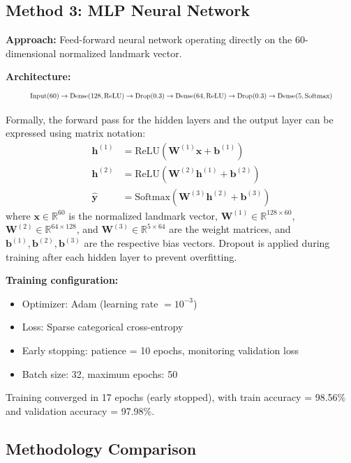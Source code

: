 \documentclass[11pt,a4paper]{article}
\begin{document}
\subsection{Method 3: MLP Neural Network}

\textbf{Approach:} Feed-forward neural network operating directly on the 60-dimensional normalized landmark vector.

\textbf{Architecture:}
\begin{equation}
\resizebox{0.9\textwidth}{!}{$\text{Input}(60) \rightarrow \text{Dense}(128, \text{ReLU}) \rightarrow \text{Drop}(0.3) \rightarrow \text{Dense}(64, \text{ReLU}) \rightarrow \text{Drop}(0.3) \rightarrow \text{Dense}(5, \text{Softmax})$}
\end{equation}

Formally, the forward pass for the hidden layers and the output layer can be expressed using matrix notation:
\begin{align}
\mathbf{h}^{(1)} &= \text{ReLU}\left(\mathbf{W}^{(1)}\mathbf{x} + \mathbf{b}^{(1)}\right) \\
\mathbf{h}^{(2)} &= \text{ReLU}\left(\mathbf{W}^{(2)}\mathbf{h}^{(1)} + \mathbf{b}^{(2)}\right) \\
\mathbf{\hat{y}} &= \text{Softmax}\left(\mathbf{W}^{(3)}\mathbf{h}^{(2)} + \mathbf{b}^{(3)}\right)
\end{align}
where $\mathbf{x} \in \mathbb{R}^{60}$ is the normalized landmark vector, $\mathbf{W}^{(1)} \in \mathbb{R}^{128 \times 60}$, $\mathbf{W}^{(2)} \in \mathbb{R}^{64 \times 128}$, and $\mathbf{W}^{(3)} \in \mathbb{R}^{5 \times 64}$ are the weight matrices, and $\mathbf{b}^{(1)}, \mathbf{b}^{(2)}, \mathbf{b}^{(3)}$ are the respective bias vectors. Dropout is applied during training after each hidden layer to prevent overfitting.

\textbf{Training configuration:}
\begin{itemize}
    \item Optimizer: Adam (learning rate $= 10^{-3}$)
    \item Loss: Sparse categorical cross-entropy
    \item Early stopping: patience = 10 epochs, monitoring validation loss
    \item Batch size: 32, maximum epochs: 50
\end{itemize}

Training converged in 17 epochs (early stopped), with train accuracy = 98.56\% and validation accuracy = 97.98\%.

\subsection{Methodology Comparison}
\end{document}
